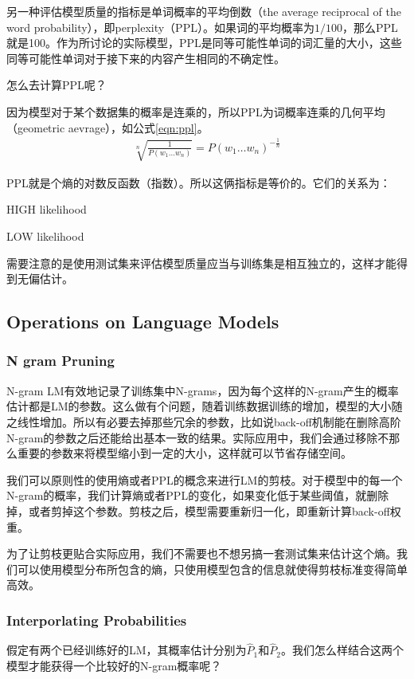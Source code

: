 {另一种评估模型质量的指标是单词概率的平均倒数（the average reciprocal of the word probability），即perplexity（PPL）。如果词的平均概率为$1/100$，那么PPL就是100。作为所讨论的实际模型，PPL是同等可能性单词的词汇量的大小，这些同等可能性单词对于接下来的内容产生相同的不确定性。

怎么去计算PPL呢？

因为模型对于某个数据集的概率是连乘的，所以PPL为词概率连乘的几何平均（geometric aevrage），如公式\ref{eqn:ppl}。
\begin{align}
\label{eqn:ppl}
\sqrt[n]{\frac{1}{P(w_{1}\ldots w_{n})}} = {P(w_{1}\ldots w_{n})}^{- \frac{1}{n}}
\end{align}

PPL就是个熵的对数反函数（指数）。所以这俩指标是等价的。它们的关系为：

HIGH likelihood \leftrightarrow {} \leftrightarrow {} \leftrightarrow {}

LOW likelihood \leftrightarrow {} \leftrightarrow {} \leftrightarrow {}

需要注意的是使用测试集来评估模型质量应当与训练集是相互独立的，这样才能得到无偏估计。
\subsection{Operations on Language Models}
\subsubsection{N gram Pruning}
N-gram LM有效地记录了训练集中N-grams，因为每个这样的N-gram产生的概率估计都是LM的参数。这么做有个问题，随着训练数据训练的增加，模型的大小随之线性增加。所以有必要去掉那些冗余的参数，比如说back-off机制能在删除高阶N-gram的参数之后还能给出基本一致的结果。实际应用中，我们会通过移除不那么重要的参数来将模型缩小到一定的大小，这样就可以节省存储空间。

我们可以原则性的使用熵或者PPL的概念来进行LM的剪枝。对于模型中的每一个N-gram的概率，我们计算熵或者PPL的变化，如果变化低于某些阈值，就删除掉，或者剪掉这个参数。剪枝之后，模型需要重新归一化，即重新计算back-off权重。

为了让剪枝更贴合实际应用，我们不需要也不想另搞一套测试集来估计这个熵。我们可以使用模型分布所包含的熵，只使用模型包含的信息就使得剪枝标准变得简单高效。

\subsubsection{Interporlating Probabilities}
假定有两个已经训练好的LM，其概率估计分别为$\hat{P}_{1}$和$\hat{P}_{2}$。我们怎么样结合这两个模型才能获得一个比较好的N-gram概率呢？

}
